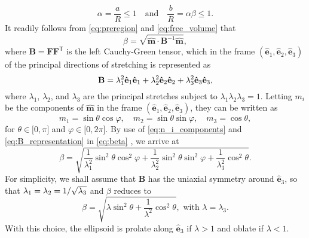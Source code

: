 \documentclass{article}
\begin{document}
\begin{equation}
\alpha =\frac{a}{R}\leq 1\quad \text{and}\quad \frac{b}{R}=\alpha \beta \leq
1.  \label{eq:alpha_beta}
\end{equation}%
It readily follows from \eqref{eq:preregion} and \eqref{eq:free_volume} that 
\begin{equation}
\beta =\sqrt{\mathbf{\hat{m}}\cdot \mathbf{B}^{-1}\mathbf{\hat{m}}},
\label{eq:beta}
\end{equation}%
where $\mathbf{B}=\mathbf{F}\mathbf{F}^{\mathsf{T}}$ is the left
Cauchy-Green tensor, which in the frame $(\mathbf{\hat{e}}_{1},\mathbf{\hat{e%
}}_{2},\mathbf{\hat{e}}_{3})$ of the principal directions of stretching is
represented as 
\begin{equation}
\mathbf{B}=\lambda _{1}^{2}\mathbf{\hat{e}}_{1}\mathbf{\hat{e}}_{1}+\lambda
_{2}^{2}\mathbf{\hat{e}}_{2}\mathbf{\hat{e}}_{2}+\lambda _{3}^{2}\mathbf{%
\hat{e}}_{3}\mathbf{\hat{e}}_{3},  \label{eq:B_representation}
\end{equation}%
where $\lambda _{1}$, $\lambda _{2}$, and $\lambda _{3}$ are the principal
stretches subject to $\lambda _{1}\lambda _{2}\lambda _{3}=1$. Letting $%
m_{i} $ be the components of $\mathbf{\hat{m}}$ in the frame $(\mathbf{\hat{e%
}}_{1},\mathbf{\hat{e}}_{2},\mathbf{\hat{e}}_{3})$, they can be written as 
\begin{equation}
m_{1}=\sin \theta \cos \varphi ,\quad m_{2}=\sin \theta \sin \varphi ,\quad
m_{3}=\cos \theta ,  \label{eq:n_i_components}
\end{equation}%
for $\theta \in \lbrack 0,\pi ]$ and $\varphi \in \lbrack 0,2\pi ]$. By use
of \eqref{eq:n_i_components} and \eqref{eq:B_representation} in %
\eqref{eq:beta} , we arrive at 
\begin{equation}
\beta =\sqrt{\frac{1}{\lambda _{1}^{2}}\sin ^{2}\theta \cos ^{2}\varphi +%
\frac{1}{\lambda _{2}^{2}}\sin ^{2}\theta \sin ^{2}\varphi +\frac{1}{\lambda
_{3}^{2}}\cos ^{2}\theta }.  \label{eq:beta_general}
\end{equation}%
For simplicity, we shall assume that $\mathbf{B}$ has the uniaxial symmetry
around $\hat{\mathbf{e}}_{3}$, so that $\lambda _{1}=\lambda _{2}=1/\sqrt{%
\lambda _{3}}$ and $\beta $ reduces to 
\begin{equation}
\beta =\sqrt{{\lambda }\sin ^{2}\theta +\frac{1}{\lambda ^{2}}\cos
^{2}\theta },\text{ with }\lambda =\lambda _{3}.  \label{eq:beta_reduced}
\end{equation}%
With this choice, the ellipsoid is prolate along $\hat{\mathbf{e}}_{3}$ if $%
\lambda >1$ and oblate if $\lambda <1$.
\end{document}
